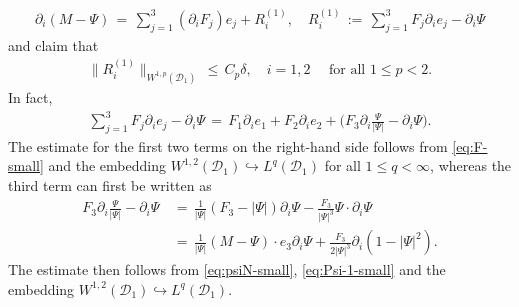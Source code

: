 \documentclass[reqno,makeidx,12pt]{amsart}
\theoremstyle{note}
\theoremstyle{definition}
\begin{document}
\begin{gather}
	\partial_i (M-\Psi)\,=\, \sum_{j=1}^3 (\partial_i F_j) e_j +R_i^{(1)},\quad R_i^{(1)}\,:=\, \sum_{j=1}^3 F_j\partial_i e_j -\partial_i\Psi \label{eq:del-m-psi}
\end{gather}
and claim that
\begin{gather}
	\|R_i^{(1)}\|_{W^{1,p}({\mathcal{D}}_1)}\,\leq\, C_p\delta,\quad i=1,2\quad\text{ for all }1\leq p<2. \label{eq:Ri-small}
\end{gather}
In fact,
\begin{gather*}
	\sum_{j=1}^3 F_j\partial_i e_j -\partial_i\Psi\,=\,  F_1\partial_i e_1 + F_2\partial_i e_2 +\big( F_3\partial_i\frac{\Psi}{|\Psi|} - \partial_i\Psi\big).
\end{gather*}
The estimate for the first two terms on the right-hand side follows from \eqref{eq:F-small} and the embedding $W^{1,2}({\mathcal{D}}_1)\hookrightarrow L^q({\mathcal{D}}_1)$ for all $1\leq q<\infty$, whereas the third term can first be written as
\begin{align*}
	F_3\partial_i\frac{\Psi}{|\Psi|} - \partial_i\Psi\,&=\, \frac{1}{|\Psi|}(F_3-|\Psi|)\partial_i\Psi - \frac{F_3}{|\Psi|^3}\Psi\cdot\partial_i\Psi\\
		\,&=\, \frac{1}{|\Psi|}(M-\Psi)\cdot e_3\partial_i\Psi +\frac{F_3}{2|\Psi|^3}\partial_i(1-|\Psi|^2).
\end{align*}
The estimate then follows from \eqref{eq:psiN-small}, \eqref{eq:Psi-1-small} and the embedding $W^{1,2}({\mathcal{D}}_1)\hookrightarrow L^q({\mathcal{D}}_1)$.
\end{document}
